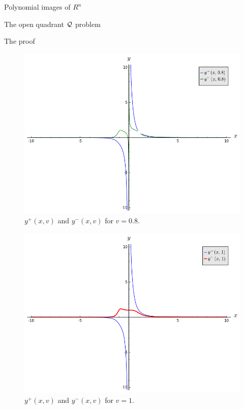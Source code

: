 \documentclass[11pt, a4paper, english, twoside, notitlepage]{report}
\begin{document}
\begin{chapter}{Polynomial images of $R^n$}
\begin{section}{The open quadrant $\mathcal{Q}$ problem}
\begin{subsection}{The proof}
\begin{Proof}
			\begin{figure}
				\centering
				\includegraphics[width=1\textwidth]{plots/ch1_06_sols.png}
				\caption{$y^+(x,v)$ and $y^-(x,v)$ for $v = 0.8$.\label{fig:plotYs_1}}
			\end{figure}
			
			\begin{figure}
				\centering
				\includegraphics[width=1\textwidth]{plots/ch1_07_sols_1.png}
				\caption{$y^+(x,v)$ and $y^-(x,v)$ for $v = 1$.\label{fig:plotYs_2}}
			\end{figure}


\end{Proof}
\end{subsection}
\end{section}
\end{chapter}
\end{document}

